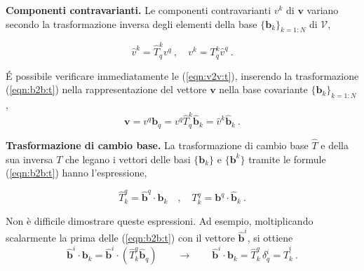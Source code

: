 \vspace{5pt} \noindent
\textbf{Componenti contravarianti.} Le componenti contravarianti $v^k$ di $\bm{v}$ variano secondo la trasformazione inversa degli elementi della base $\{ \bm{b}_k \}_{k=1:N}$ di $\mathcal{V}$,
\begin{fBox}
\begin{equation}\label{eqn:v2v:t}
 \hat{v}^k = \hat{T}^k_q v^q \ , \quad v^k = T^k_q \hat{v}^q \ .
\end{equation}
\end{fBox}
\'E possibile verificare immediatamente le (\ref{eqn:v2v:t}), inserendo la trasformazione (\ref{eqn:b2b:t}) nella rappresentazione del vettore $\bm{v}$ nella base covariante $\{ \bm{b}_k \}_{k=1:N}$,
 \begin{equation}
  \bm{v} = v^q \bm{b}_q = v^q \hat{T}^k_q \bm{\hat{b}}_k = \hat{v}^k \bm{\hat{b}}_k \ .
 \end{equation}

\vspace{5pt} \noindent
\textbf{Trasformazione di cambio base.} La trasformazione di cambio base $\hat{T}$ e della sua inversa $T$ che legano i vettori delle basi $\{\bm{b}_k\}$ e  $\{\bm{b}^k\}$ tramite le formule (\ref{eqn:b2b:t}) hanno l'espressione,
\begin{fBox}
\begin{equation}
  \hat{T}^q_k = \bm{\hat{b}}^q \cdot \bm{b}_k \quad , \quad T^q_k = \bm{b}^q \cdot \bm{\hat{b}}_k \ .
\end{equation}
\end{fBox}
Non è difficile dimostrare queste espressioni. Ad esempio, moltiplicando scalarmente la prima delle (\ref{eqn:b2b:t}) con il vettore $\bm{\hat{b}}^i$, si ottiene
\begin{equation}
 \bm{\hat{b}}^i \cdot \bm{b}_k = \bm{\hat{b}}^i \cdot \left( \hat{T}^q_k \bm{\hat{b}}_q \right)
 \qquad  \rightarrow \qquad 
 \bm{\hat{b}}^i \cdot \bm{b}_k = \hat{T}^q_k \, \delta^i_q = \hat{T}^i_k \ .
\end{equation}

